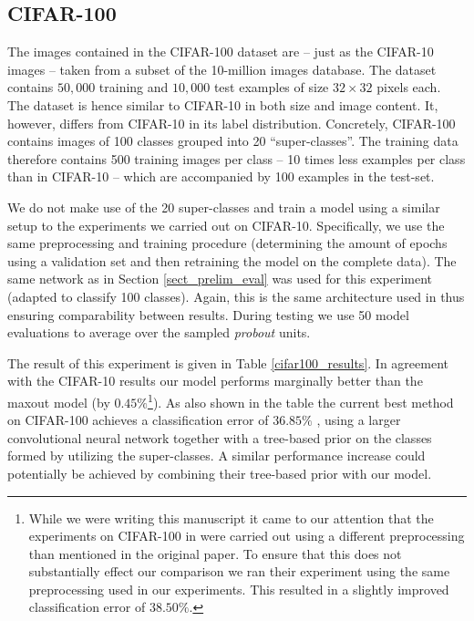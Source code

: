 \documentclass{article} \pdfoutput=1
\begin{document}
\subsection{CIFAR-100}
The images contained in the CIFAR-100 dataset \cite{Krizhevsky2009}
are -- just as the CIFAR-10 images -- taken from a subset of the
10-million images database. The dataset contains $50,000$ training and
$10,000$ test examples of size $32\times32$ pixels each. The dataset
is hence similar to CIFAR-10 in both size and image content. It,
however, differs from CIFAR-10 in its label distribution. Concretely,
CIFAR-100 contains images of 100 classes grouped into 20
``super-classes''. The training data therefore contains 500 training
images per class -- 10 times less examples per class than in
CIFAR-10 -- which are accompanied by 100 examples in the test-set.

We do not make use of the 20 super-classes and train a model using a
similar setup to the experiments we carried out on CIFAR-10.
Specifically, we use the same preprocessing and training procedure
(determining the amount of epochs using a validation set and then
retraining the model on the complete data). The same network as in
Section \ref{sect_prelim_eval} was used for this experiment (adapted
to classify 100 classes). Again, this is the same architecture used
in \cite{Goodfellow2013} thus ensuring comparability between results.
During testing we use 50 model evaluations to average over the sampled
\emph{probout} units.

The result of this experiment is given in Table
\ref{cifar100_results}. In agreement with the CIFAR-10 results our
model performs marginally better than the maxout model (by $0.45 \%$\footnote{While we were
  writing this manuscript it came to our attention that the
  experiments on CIFAR-100 in \cite{Goodfellow2013} were carried out
  using a different preprocessing than mentioned in the original paper. To
  ensure that this does not substantially effect our comparison we ran
  their experiment using the same preprocessing used in our
  experiments. This resulted in a slightly improved classification
  error of $38.50 \%$.}). As
also shown in the table the current best method on CIFAR-100 achieves
a classification error of $36.85 \%$ \cite{Nitish2013}, using a larger
convolutional neural network together with a tree-based prior on the
classes formed by utilizing the super-classes. A similar
performance increase could potentially be achieved by combining their
tree-based prior with our model.
\end{document}
